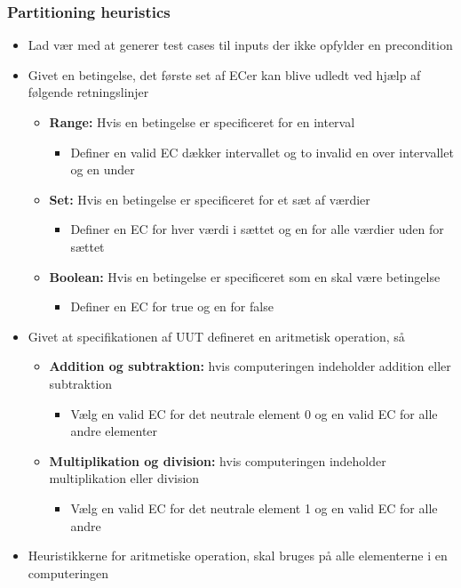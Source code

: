 \documentclass[a4, english]{article}
\begin{document}
\subsubsection{Partitioning heuristics}
\begin{itemize} 
  \item Lad vær med at generer test cases til inputs der ikke opfylder en precondition
  \item Givet en betingelse, det første set af ECer kan blive udledt ved hjælp af følgende retningslinjer 
  \begin{itemize}
    \item \textbf{Range:} Hvis en betingelse er specificeret for en interval 
    \begin{itemize}
      \item Definer en valid EC dækker intervallet og to invalid en over intervallet og en under
    \end{itemize}
    \item \textbf{Set:} Hvis en betingelse er specificeret for et sæt af værdier
    \begin{itemize}
      \item Definer en EC for hver værdi i sættet og en for alle værdier uden for sættet
    \end{itemize}
    \item \textbf{Boolean:} Hvis en betingelse er specificeret som en skal være betingelse
    \begin{itemize}
      \item Definer en EC for true og en for false
    \end{itemize}
  \end{itemize}
  \item Givet at specifikationen af UUT defineret en aritmetisk operation, så 
  \begin{itemize}
    \item \textbf{Addition og subtraktion:} hvis computeringen indeholder addition eller subtraktion
    \begin{itemize}
      \item Vælg en valid EC for det neutrale element 0 og en valid EC for alle andre elementer 
    \end{itemize} 
    \item \textbf{Multiplikation og division:} hvis computeringen indeholder multiplikation eller division
    \begin{itemize}
      \item Vælg en valid EC for det neutrale element 1 og en valid EC for alle andre 
    \end{itemize} 
  \end{itemize}  
  \item Heuristikkerne for aritmetiske operation, skal bruges på alle elementerne i en computeringen
\end{itemize}
\end{document}
